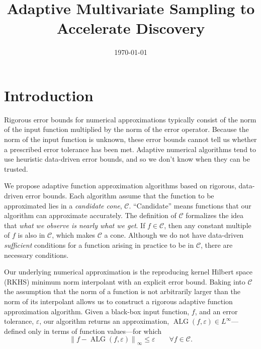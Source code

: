 \documentclass[]{mcom-l}
\title{Adaptive Multivariate Sampling to Accelerate Discovery}
\author{}
\date{\today}
\theoremstyle{remark}
\DeclareMathOperator{\ALG}{ALG}
\newcommand{\cc}{\mathcal{C}}
\newcommand{\calc}{{\mathcal{C}}}
\newcommand{\norm}[2][{}]{\ensuremath{\left \lVert #2 \right \rVert}_{#1}}
\begin{document}
\maketitle

\section{Introduction}
Rigorous error bounds for numerical approximations typically consist of the norm of the input function multiplied by the norm of the error operator.  Because the norm of the input function is unknown, these error bounds cannot tell us whether a prescribed error tolerance has been met.  Adaptive numerical algorithms tend to use heuristic data-driven error bounds, and so we don't know when they can be trusted.

We propose  adaptive function approximation algorithms based on rigorous, data-driven error bounds.  Each algorithm assume that the function to be approximated lies in a \emph{candidate cone}, $\cc$.  ``Candidate'' means functions that our algorithm can approximate accurately.  The definition of $\cc$ formalizes the idea that \emph{what we observe is nearly what we get}.  If $f \in \cc$, then any constant multiple of $f$ is also in $\cc$, which makes $\cc$ a cone.  Although we do not have data-driven \emph{sufficient} conditions for a function arising in practice to be in $\calc$, there are necessary conditions.

Our underlying numerical approximation is the reproducing kernel Hilbert space (RKHS) minimum norm interpolant with an explicit error bound.  Baking into $\cc$ the assumption that the norm of a function is not arbitrarily larger than the norm of its interpolant allows us to construct a rigorous adaptive function approximation algorithm. Given a black-box input function, $f$, and an error tolerance, $\varepsilon$, our algorithm returns an approximation, $\ALG(f,\varepsilon) \in L^\infty$---defined only in terms of function values---for which 
\begin{equation} \label{eq:errorcrit}
\norm[\infty]{f - \ALG(f,\varepsilon)} \le \varepsilon \qquad \forall f\in \cc.
\end{equation}
\end{document}
